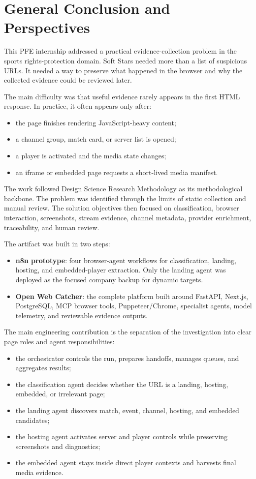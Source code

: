 \chapter{General Conclusion and Perspectives}\label{chap:conclusion}


This PFE internship addressed a practical evidence-collection problem in the sports
rights-protection domain. Soft Stars needed more than a list of suspicious URLs. It
needed a way to preserve what happened in the browser and why the collected evidence
could be reviewed later.

The main difficulty was that useful evidence rarely appears in the first HTML response.
In practice, it often appears only after:
\begin{itemize}
  \item the page finishes rendering JavaScript-heavy content;
  \item a channel group, match card, or server list is opened;
  \item a player is activated and the media state changes;
  \item an iframe or embedded page requests a short-lived media manifest.
\end{itemize}

The work followed Design Science Research Methodology as its methodological backbone.
The problem was identified through the limits of static collection and manual review.
The solution objectives then focused on classification, browser interaction,
screenshots, stream evidence, channel metadata, provider enrichment, traceability, and
human review.

The artifact was built in two steps:
\begin{itemize}
  \item \textbf{n8n prototype}: four browser-agent workflows for classification,
  landing, hosting, and embedded-player extraction. Only the landing agent was deployed
  as the focused company backup for dynamic targets.
  \item \textbf{Open Web Catcher}: the complete platform built around FastAPI, Next.js,
  PostgreSQL, MCP browser tools, Puppeteer/Chrome, specialist agents, model telemetry,
  and reviewable evidence outputs.
\end{itemize}

The main engineering contribution is the separation of the investigation into clear
page roles and agent responsibilities:
\begin{itemize}
  \item the orchestrator controls the run, prepares handoffs, manages queues, and
  aggregates results;
  \item the classification agent decides whether the URL is a landing, hosting,
  embedded, or irrelevant page;
  \item the landing agent discovers match, event, channel, hosting, and embedded
  candidates;
  \item the hosting agent activates server and player controls while preserving
  screenshots and diagnostics;
  \item the embedded agent stays inside direct player contexts and harvests final media
  evidence.
\end{itemize}

